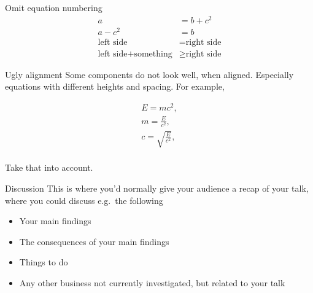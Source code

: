 \documentclass[
  10pt,
  ignorenonframetext,
]{beamer}
\providecommand{\tightlist}{%
  \setlength{\itemsep}{0pt}\setlength{\parskip}{0pt}}
\begin{document}
\begin{frame}{Omit equation numbering}
\protect\hypertarget{omit-equation-numbering}{}
\begin{align*} 
a &= b + c^2\\
a - c^2 &= b\\
\textrm{left side} &= \textrm{right side}\\
\textrm{left side} + \textrm{something} &\geq \textrm{right side}
\end{align*}
\end{frame}

\begin{frame}{Ugly alignment}
\protect\hypertarget{ugly-alignment}{}
Some components do not look well, when aligned. Especially equations
with different heights and spacing. For example,

\begin{align} 
E = mc^2, \\
m =  \frac{E}{c^2}, \\
c =  \sqrt{\frac{E}{c^2}}, \\
\end{align}

Take that into account.
\end{frame}

\begin{frame}{Discussion}
\protect\hypertarget{discussion}{}
This is where you'd normally give your audience a recap of your talk,
where you could discuss e.g.~the following

\begin{itemize}
\tightlist
\item
  Your main findings
\item
  The consequences of your main findings
\item
  Things to do
\item
  Any other business not currently investigated, but related to your
  talk
\end{itemize}
\end{frame}
\end{document}

